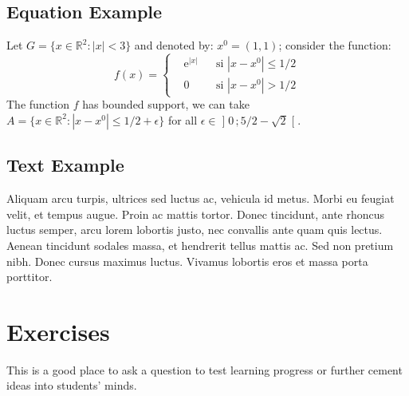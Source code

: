 \documentclass[
	11pt, %
	fleqn, %
	a4paper, %
]{LegrandOrangeBook}
\begin{document}
\subsection{Equation Example}

\begin{example} %
	Let $G=\{x\in\mathbb{R}^2:|x|<3\}$ and denoted by: $x^0=(1,1)$; consider the function:
	\begin{equation}
	f(x)=\left\{\begin{aligned} & \mathrm{e}^{|x|} & & \text{si $|x-x^0|\leq 1/2$}\\
	& 0 & & \text{si $|x-x^0|> 1/2$}\end{aligned}\right.
	\end{equation}
	The function $f$ has bounded support, we can take $A=\{x\in\mathbb{R}^2:|x-x^0|\leq 1/2+\epsilon\}$ for all $\epsilon\in\mathopen{]}0\,;5/2-\sqrt{2}\mathclose{[}$.
\end{example}

\subsection{Text Example}

\begin{example}[Example name] %
	Aliquam arcu turpis, ultrices sed luctus ac, vehicula id metus. Morbi eu feugiat velit, et tempus augue. Proin ac mattis tortor. Donec tincidunt, ante rhoncus luctus semper, arcu lorem lobortis justo, nec convallis ante quam quis lectus. Aenean tincidunt sodales massa, et hendrerit tellus mattis ac. Sed non pretium nibh. Donec cursus maximus luctus. Vivamus lobortis eros et massa porta porttitor.
\end{example}


\section{Exercises}

\begin{exercise} %
	This is a good place to ask a question to test learning progress or further cement ideas into students' minds.
\end{exercise}
\end{document}

